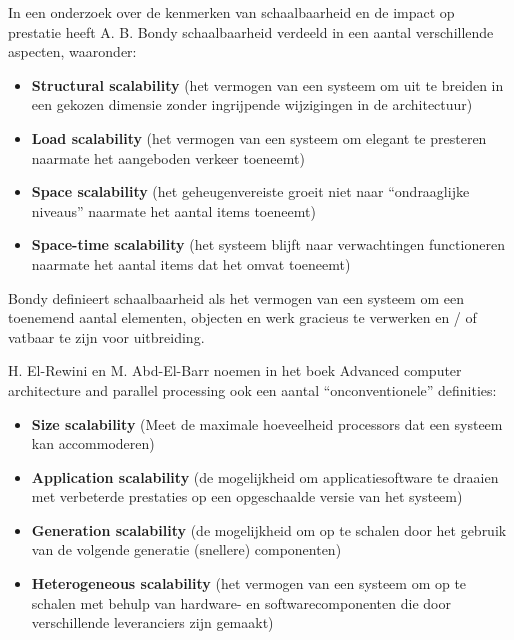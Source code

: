 In een onderzoek over de kenmerken van schaalbaarheid en de impact op prestatie heeft A. B. Bondy \parencite{ScalabilityCharacteristics} schaalbaarheid verdeeld in een aantal verschillende aspecten, waaronder:
\begin{itemize}
	\item \textbf{Structural scalability} (het vermogen van een systeem om uit te breiden in een gekozen dimensie zonder ingrijpende wijzigingen in de architectuur)
	\item \textbf{Load scalability} (het vermogen van een systeem om elegant te presteren naarmate het aangeboden verkeer toeneemt)
	\item \textbf{Space scalability} (het geheugenvereiste groeit niet naar \enquote{ondraaglijke niveaus} naarmate het aantal items toeneemt)
	\item \textbf{Space-time scalability} (het systeem blijft naar verwachtingen functioneren naarmate het aantal items dat het omvat toeneemt)
\end{itemize}
Bondy definieert schaalbaarheid als het vermogen van een systeem om een toenemend aantal elementen, objecten en werk gracieus te verwerken en / of vatbaar te zijn voor uitbreiding.

H. El-Rewini en M. Abd-El-Barr noemen in het boek Advanced computer architecture and parallel processing \parencite{AdvancedArchitecture} ook een aantal \enquote{onconventionele} definities:
\begin{itemize}
	\item \textbf{Size scalability} (Meet de maximale hoeveelheid processors dat een systeem kan accommoderen)
	\item \textbf{Application scalability} (de mogelijkheid om applicatiesoftware te draaien met verbeterde prestaties op een opgeschaalde versie van het systeem)
	\item \textbf{Generation scalability} (de mogelijkheid om op te schalen door het gebruik van de volgende generatie (snellere) componenten)
	\item \textbf{Heterogeneous scalability} (het vermogen van een systeem om op te schalen met behulp van hardware- en softwarecomponenten die door verschillende leveranciers zijn gemaakt)
\end{itemize}

